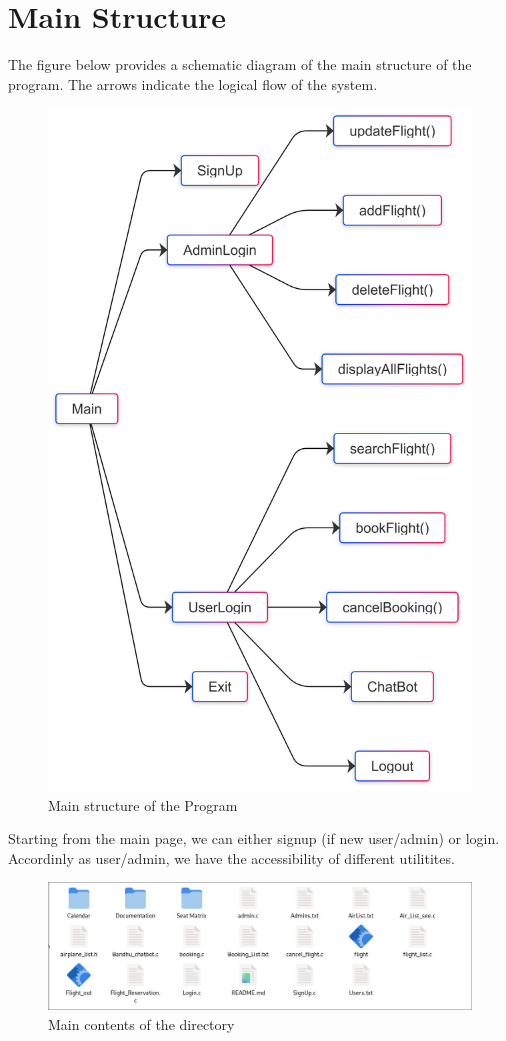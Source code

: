 \documentclass[a4paper]{scrartcl}
\begin{document}
\section{Main Structure}
The figure below provides a schematic diagram of the main structure of the program. The arrows indicate the logical flow of the system.
\begin{figure}[H]
    \centering
    \includegraphics[scale=0.1]{main structure.png}
    \caption{Main structure of the Program}
\end{figure}
\noindent
Starting from the main page, we can either signup (if new user/admin) or login. Accordinly as user/admin, we have the accessibility of different utilitites. 
\begin{figure}[H]
    \centering
    \includegraphics[scale=0.5]{content.jpg}
    \caption{Main contents of the directory}
\end{figure}
\end{document}
